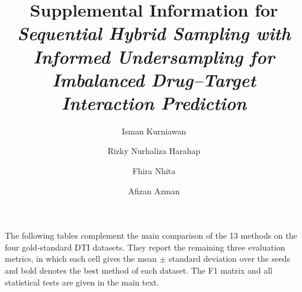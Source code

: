 \documentclass[10pt,a4paper]{article}
\title{Supplemental Information for\\
  \emph{Sequential Hybrid Sampling with Informed Undersampling for
  Imbalanced Drug--Target Interaction Prediction}}
\author{Isman Kurniawan \and Rizky Nurhaliza Harahap \and Fhira Nhita \and Afizan Azman}
\date{}
\begin{document}
\maketitle

The following tables complement the main comparison of the 13 methods on
the four gold-standard DTI datasets. They report the remaining three
evaluation metrics, in which each cell gives the mean $\pm$ standard
deviation over the seeds and bold denotes the best method of each
dataset. The F1 matrix and all statistical tests are given in the main
text.

\begin{table}[htbp]
\centering
\caption{The G-Mean scores (mean $\pm$ SD) of the 13 methods on the four
datasets.}
\end{table}

\begin{table}[htbp]
\centering
\caption{The balanced accuracy scores (mean $\pm$ SD) of the 13 methods
on the four datasets.}
\end{table}

\begin{table}[htbp]
\centering
\caption{The AUPRC values (mean $\pm$ SD) of the 13 methods on the four
datasets.}
\end{table}
\end{document}
